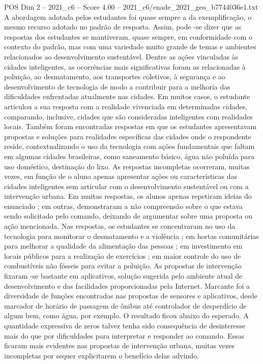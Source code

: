 \begin{textsample}{POS Dim 2 – 2021\_c6 – Score 4.00 – 2021\_c6/enade\_2021\_geo\_b7744036e1.txt}
A abordagem adotada pelos estudantes foi quase sempre a da exemplificação, o mesmo recurso adotado no padrão de resposta.
Assim, pode -se dizer que as respostas dos estudantes se mantiveram, quase sempre, em conformidade com o contexto do padrão, mas com uma variedade muito grande de temas e ambientes relacionados ao desenvolvimento sustentável.
Dentre as ações vinculadas às cidades inteligentes, as ocorrências mais significativas foram as relacionadas à poluição, ao desmatamento, aos transportes coletivos, à segurança e ao desenvolvimento de tecnologia de modo a contribuir para a melhoria das dificuldades enfrentadas atualmente nas cidades.
Em muitos casos, o estudante articulou a sua resposta com a realidade vivenciada em determinadas cidades, comparando, inclusive, cidades que são consideradas inteligentes com realidades locais.
Também foram encontradas respostas em que os estudantes apresentavam propostas e soluções para realidades específicas das cidades onde o respondente reside, contextualizando o uso da tecnologia com ações fundamentais que faltam em algumas cidades brasileiras, como saneamento básico, água não poluída para uso doméstico, destinação do lixo.
As respostas incompletas ocorreram, muitas vezes, em função de o aluno apenas apresentar ações ou características das cidades inteligentes sem articular com o desenvolvimento sustentável ou com a intervenção urbana.
Em muitas respostas, os alunos apenas repetiram ideias do enunciado ; em outras, demonstraram a não compreensão sobre o que estava sendo solicitado pelo comando, deixando de argumentar sobre uma proposta ou ação mencionada.
Nas respostas, os estudantes se concentraram no uso da tecnologia para monitorar o desmatamento e a violência ; em hortas comunitárias para melhorar a qualidade da alimentação das pessoas ; em investimento em locais públicos para a realização de exercícios ; em maior controle do uso de combustíveis não fósseis para evitar a poluição.
As propostas de intervenção fixaram -se bastante em aplicativos, solução sugerida pelo ambiente atual de desenvolvimento e das facilidades proporcionadas pela Internet.
Marcante foi a diversidade de funções encontradas nas propostas de sensores e aplicativos, desde marcador de horário de passagem de ônibus até controlador de desperdício de algum bem, como água, por exemplo.
O resultado ficou abaixo do esperado.
A quantidade expressiva de zeros talvez tenha sido consequência de desinteresse mais do que por dificuldades para interpretar e responder ao comando.
Essas ficaram mais evidentes nas propostas de intervenção urbana, muitas vezes incompletas por sequer explicitarem o benefício delas advindo.

\end{textsample}
